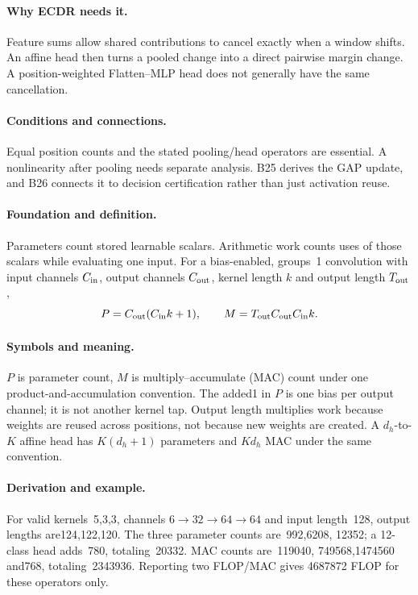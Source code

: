 \paragraph{Why ECDR needs it.}
Feature sums allow shared contributions to cancel exactly when a window
shifts. An affine head then turns a pooled change into a direct pairwise
margin change. A position-weighted Flatten--MLP head does not generally
have the same cancellation.
\paragraph{Conditions and connections.}
Equal position counts and the stated pooling/head operators are essential.
A nonlinearity after pooling needs separate analysis. B25 derives the GAP
update, and B26 connects it to decision certification rather than just
activation reuse.

\paragraph{Foundation and definition.}
Parameters count stored learnable scalars. Arithmetic work counts uses of
those scalars while evaluating one input. For a bias-enabled, groups~1
convolution with input channels $C_{\rm in}$, output channels $C_{\rm out}$,
kernel length $k$ and output length $T_{\rm out}$,
\[
 P=C_{\rm out}(C_{\rm in}k+1),\qquad
 M=T_{\rm out}C_{\rm out}C_{\rm in}k.
\]
\paragraph{Symbols and meaning.}
$P$ is parameter count, $M$ is multiply--accumulate (MAC) count under one
product-and-accumulation convention. The added1 in $P$ is one bias per
output channel; it is not another kernel tap. Output length multiplies
work because weights are reused across positions, not because new weights
are created. A $d_h$-to-$K$ affine head has $K(d_h+1)$ parameters and
$Kd_h$ MAC under the same convention.
\paragraph{Derivation and example.}
For valid kernels~5,3,3, channels $6\to32\to64\to64$ and input length~128,
output lengths are124,122,120. The three parameter counts are~992,6208,
12352; a 12-class head adds~780, totaling~20332. MAC counts are~119040,
749568,1474560 and768, totaling~2343936. Reporting two FLOP/MAC gives
4687872 FLOP for these operators only.
